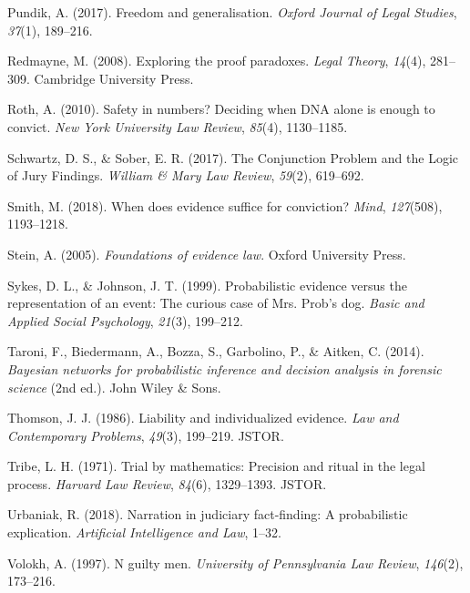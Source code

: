 \documentclass[10pt,dvipsnames,enabledeprecatedfontcommands]{scrartcl}
\begin{document}
\leavevmode\hypertarget{ref-pundik2017}{}%
Pundik, A. (2017). Freedom and generalisation. \emph{Oxford Journal of
Legal Studies}, \emph{37}(1), 189--216.

\leavevmode\hypertarget{ref-redmayne2008exploring}{}%
Redmayne, M. (2008). Exploring the proof paradoxes. \emph{Legal Theory},
\emph{14}(4), 281--309. Cambridge University Press.

\leavevmode\hypertarget{ref-Roth2010}{}%
Roth, A. (2010). Safety in numbers? Deciding when DNA alone is enough to
convict. \emph{New York University Law Review}, \emph{85}(4),
1130--1185.

\leavevmode\hypertarget{ref-schwartz2017ConjunctionProblemLogic}{}%
Schwartz, D. S., \& Sober, E. R. (2017). The Conjunction Problem and the
Logic of Jury Findings. \emph{William \& Mary Law Review}, \emph{59}(2),
619--692.

\leavevmode\hypertarget{ref-smith2017}{}%
Smith, M. (2018). When does evidence suffice for conviction?
\emph{Mind}, \emph{127}(508), 1193--1218.

\leavevmode\hypertarget{ref-Stein05}{}%
Stein, A. (2005). \emph{Foundations of evidence law}. Oxford University
Press.

\leavevmode\hypertarget{ref-sykes1999}{}%
Sykes, D. L., \& Johnson, J. T. (1999). Probabilistic evidence versus
the representation of an event: The curious case of Mrs. Prob's dog.
\emph{Basic and Applied Social Psychology}, \emph{21}(3), 199--212.

\leavevmode\hypertarget{ref-taroni2006bayesian}{}%
Taroni, F., Biedermann, A., Bozza, S., Garbolino, P., \& Aitken, C.
(2014). \emph{Bayesian networks for probabilistic inference and decision
analysis in forensic science} (2nd ed.). John Wiley \& Sons.

\leavevmode\hypertarget{ref-thomson1986liability}{}%
Thomson, J. J. (1986). Liability and individualized evidence. \emph{Law
and Contemporary Problems}, \emph{49}(3), 199--219. JSTOR.

\leavevmode\hypertarget{ref-tribe1971trial}{}%
Tribe, L. H. (1971). Trial by mathematics: Precision and ritual in the
legal process. \emph{Harvard Law Review}, \emph{84}(6), 1329--1393.
JSTOR.

\leavevmode\hypertarget{ref-urbaniak2018narration}{}%
Urbaniak, R. (2018). Narration in judiciary fact-finding: A
probabilistic explication. \emph{Artificial Intelligence and Law},
1--32.

\leavevmode\hypertarget{ref-voloch1997}{}%
Volokh, A. (1997). N guilty men. \emph{University of Pennsylvania Law
Review}, \emph{146}(2), 173--216.
\end{document}
